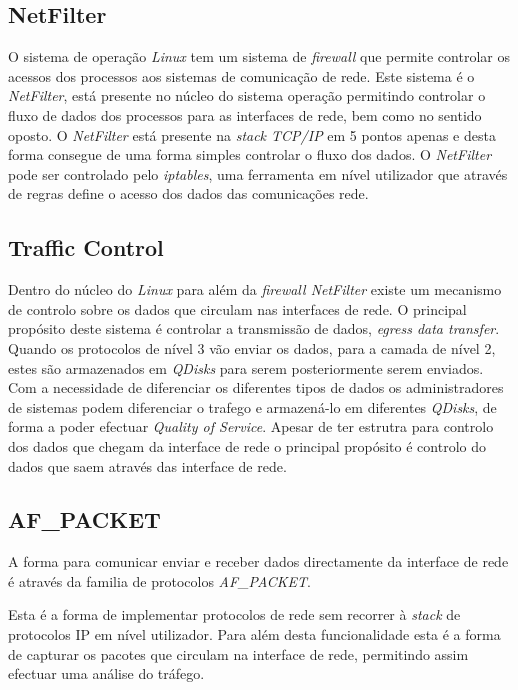\subsection{NetFilter}

O sistema de operação \textit{Linux} tem um sistema de \textit{firewall} que permite controlar os acessos dos processos aos sistemas de comunicação de rede.
 Este sistema é o \textit{NetFilter}, está presente no núcleo do sistema operação permitindo controlar o fluxo de dados dos processos para as interfaces de rede, bem como no sentido oposto.
 O \textit{NetFilter} está presente na \textit{stack TCP/IP} em 5 pontos apenas e desta forma consegue de uma forma simples controlar o fluxo dos dados.
 O \textit{NetFilter} pode ser controlado pelo \textit{iptables}, uma ferramenta em nível utilizador que através de regras define o acesso dos dados das comunicações rede.

\subsection{Traffic Control}
 Dentro do núcleo do \textit{Linux} para além da \textit{firewall NetFilter} existe um mecanismo de controlo sobre os dados que circulam nas interfaces de rede.
 O principal propósito deste sistema é controlar a transmissão de dados, \textit{egress data transfer}.
 Quando os protocolos de nível 3 vão enviar os dados, para a camada de nível 2, estes são armazenados em \textit{QDisks} para serem posteriormente serem enviados.
 Com a necessidade de diferenciar os diferentes tipos de dados os administradores de sistemas podem diferenciar o trafego e armazená-lo em diferentes \textit{QDisks}, de forma a poder efectuar \textit{Quality of Service}.
Apesar de ter estrutra para controlo dos dados que chegam da interface de rede o principal propósito é controlo do dados que saem através das interface de rede.

\subsection{AF\_PACKET}

A forma para comunicar enviar e receber dados directamente da interface de rede é através da familia de protocolos \textit{AF\_PACKET}. 

Esta é a forma de implementar protocolos de rede sem recorrer à \textit{stack} de protocolos IP em nível utilizador.
 Para além desta funcionalidade esta é a forma de capturar os pacotes que circulam na interface de rede, permitindo assim efectuar uma análise do tráfego.

